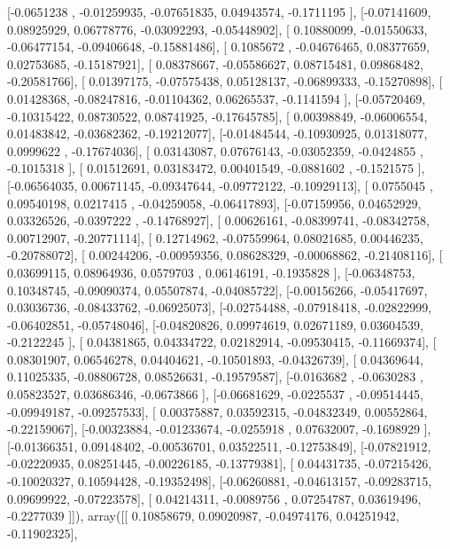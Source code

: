 \documentclass{article}
\begin{document}
       [-0.0651238 , -0.01259935, -0.07651835,  0.04943574, -0.1711195 ],
       [-0.07141609,  0.08925929,  0.06778776, -0.03092293, -0.05448902],
       [ 0.10880099, -0.01550633, -0.06477154, -0.09406648, -0.15881486],
       [ 0.1085672 , -0.04676465,  0.08377659,  0.02753685, -0.15187921],
       [ 0.08378667, -0.05586627,  0.08715481,  0.09868482, -0.20581766],
       [ 0.01397175, -0.07575438,  0.05128137, -0.06899333, -0.15270898],
       [ 0.01428368, -0.08247816, -0.01104362,  0.06265537, -0.1141594 ],
       [-0.05720469, -0.10315422,  0.08730522,  0.08741925, -0.17645785],
       [ 0.00398849, -0.06006554,  0.01483842, -0.03682362, -0.19212077],
       [-0.01484544, -0.10930925,  0.01318077,  0.0999622 , -0.17674036],
       [ 0.03143087,  0.07676143, -0.03052359, -0.0424855 , -0.1015318 ],
       [ 0.01512691,  0.03183472,  0.00401549, -0.0881602 , -0.1521575 ],
       [-0.06564035,  0.00671145, -0.09347644, -0.09772122, -0.10929113],
       [ 0.0755045 ,  0.09540198,  0.0217415 , -0.04259058, -0.06417893],
       [-0.07159956,  0.04652929,  0.03326526, -0.0397222 , -0.14768927],
       [ 0.00626161, -0.08399741, -0.08342758,  0.00712907, -0.20771114],
       [ 0.12714962, -0.07559964,  0.08021685,  0.00446235, -0.20788072],
       [ 0.00244206, -0.00959356,  0.08628329, -0.00068862, -0.21408116],
       [ 0.03699115,  0.08964936,  0.0579703 ,  0.06146191, -0.1935828 ],
       [-0.06348753,  0.10348745, -0.09090374,  0.05507874, -0.04085722],
       [-0.00156266, -0.05417697,  0.03036736, -0.08433762, -0.06925073],
       [-0.02754488, -0.07918418, -0.02822999, -0.06402851, -0.05748046],
       [-0.04820826,  0.09974619,  0.02671189,  0.03604539, -0.2122245 ],
       [ 0.04381865,  0.04334722,  0.02182914, -0.09530415, -0.11669374],
       [ 0.08301907,  0.06546278,  0.04404621, -0.10501893, -0.04326739],
       [ 0.04369644,  0.11025335, -0.08806728,  0.08526631, -0.19579587],
       [-0.0163682 , -0.0630283 ,  0.05823527,  0.03686346, -0.0673866 ],
       [-0.06681629, -0.0225537 , -0.09514445, -0.09949187, -0.09257533],
       [ 0.00375887,  0.03592315, -0.04832349,  0.00552864, -0.22159067],
       [-0.00323884, -0.01233674, -0.0255918 ,  0.07632007, -0.1698929 ],
       [-0.01366351,  0.09148402, -0.00536701,  0.03522511, -0.12753849],
       [-0.07821912, -0.02220935,  0.08251445, -0.00226185, -0.13779381],
       [ 0.04431735, -0.07215426, -0.10020327,  0.10594428, -0.19352498],
       [-0.06260881, -0.04613157, -0.09283715,  0.09699922, -0.07223578],
       [ 0.04214311, -0.0089756 ,  0.07254787,  0.03619496, -0.2277039 ]]), array([[ 0.10858679,  0.09020987, -0.04974176,  0.04251942, -0.11902325],
\end{document}
